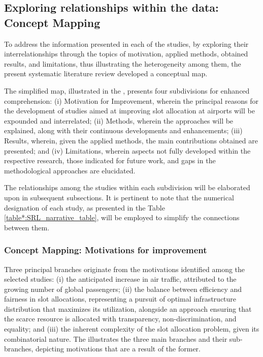 
\clearpage







\subsection{Exploring relationships within the data: Concept Mapping}

To address the information presented in each of the studies, by exploring their
interrelationships through the topics of motivation, applied methods, obtained
results, and limitations, thus illustrating the heterogeneity among them, the
present systematic literature review developed a conceptual map.


The simplified map, illustrated in the , presents four
subdivisions for enhanced comprehension: (i) Motivation for Improvement, wherein
the principal reasons for the development of studies aimed at improving slot
allocation at airports will be expounded and interrelated; (ii) Methods, wherein
the approaches will be explained, along with their continuous developments and
enhancements; (iii) Results, wherein, given the applied methods, the main
contributions obtained are presented; and (iv) Limitations, wherein aspects not
fully developed within the respective research, those indicated for future work,
and gaps in the methodological approaches are elucidated.


The relationships among the studies within each subdivision will be elaborated
upon in subsequent subsections.
%
It is pertinent to note that the numerical designation of each study, as
presented in the Table \ref{table*:SRL_narrative_table}, will be employed to
simplify the connections between them.


%




\subsubsection{Concept Mapping: Motivations for improvement}

Three principal branches originate from the motivations identified among the
selected studies: (i) the anticipated increase in air traffic, attributed to the
growing number of global passengers; (ii) the balance between efficiency and
fairness in slot allocations, representing a pursuit of optimal infrastructure
distribution that maximizes its utilization, alongside an approach ensuring that
the scarce resource is allocated with transparency, non-discrimination, and
equality; and (iii) the inherent complexity of the slot allocation problem,
given its combinatorial nature.
%
The  illustrates the three main branches and their
sub-branches, depicting motivations that are a result of the former.



